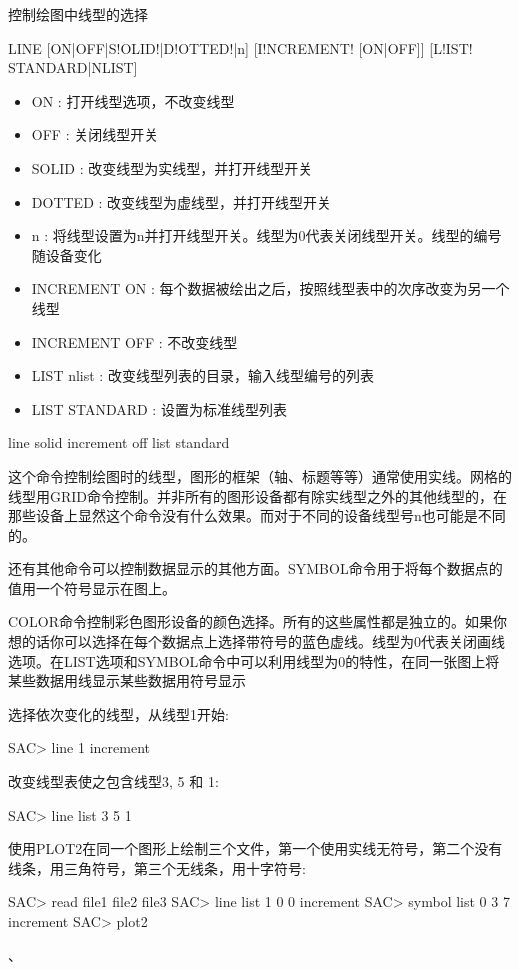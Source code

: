 \label{cmd:line}

控制绘图中线型的选择

\begin{SACSTX}
LINE [ON|OFF|S!OLID!|D!OTTED!|n] [I!NCREMENT! [ON|OFF]] [L!IST! STANDARD|NLIST]
\end{SACSTX}

\begin{itemize}
\item ON : 打开线型选项，不改变线型 
\item OFF : 关闭线型开关 
\item SOLID : 改变线型为实线型，并打开线型开关 
\item DOTTED : 改变线型为虚线型，并打开线型开关 
\item n : 将线型设置为n并打开线型开关。线型为0代表关闭线型开关。线型的编号随设备变化 
\item INCREMENT {ON} : 每个数据被绘出之后，按照线型表中的次序改变为另一个线型 
\item INCREMENT OFF : 不改变线型 
\item LIST nlist : 改变线型列表的目录，输入线型编号的列表 
\item LIST STANDARD : 设置为标准线型列表 
\end{itemize}

\begin{SACDFT}
line solid increment off list standard
\end{SACDFT}

这个命令控制绘图时的线型，图形的框架（轴、标题等等）通常使用实线。网格的线型用GRID命令控制。并非所有的图形设备都有除实线型之外的其他线型的，在那些设备上显然这个命令没有什么效果。而对于不同的设备线型号n也可能是不同的。

还有其他命令可以控制数据显示的其他方面。SYMBOL命令用于将每个数据点的值用一个符号显示在图上。

COLOR命令控制彩色图形设备的颜色选择。所有的这些属性都是独立的。如果你想的话你可以选择在每个数据点上选择带符号的蓝色虚线。线型为0代表关闭画线选项。在LIST选项和SYMBOL命令中可以利用线型为0的特性，在同一张图上将某些数据用线显示某些数据用符号显示

选择依次变化的线型，从线型1开始:
\begin{SACCode}
SAC> line 1 increment
\end{SACCode}

改变线型表使之包含线型3, 5 和 1:
\begin{SACCode}
SAC> line list 3 5 1
\end{SACCode}

使用PLOT2在同一个图形上绘制三个文件，第一个使用实线无符号，第二个没有线条，用三角符号，第三个无线条，用十字符号:
\begin{SACCode}
SAC> read file1 file2 file3
SAC> line list 1 0 0 increment
SAC> symbol list 0 3 7 increment
SAC> plot2
\end{SACCode}

、
